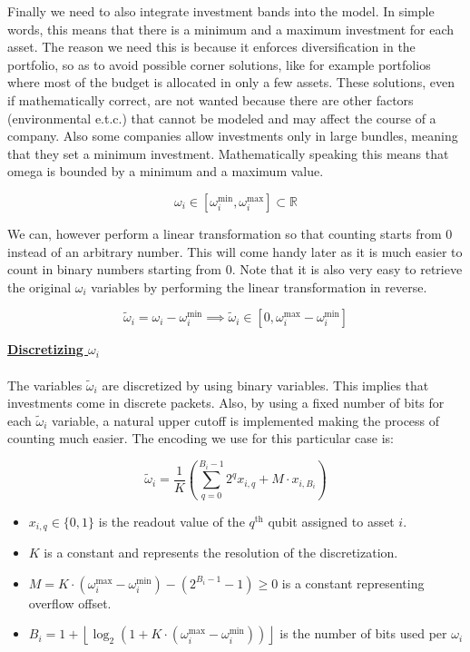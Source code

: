 \documentclass[12pt,a4paper]{report}
\begin{document}
\noindent
Finally we need to also integrate investment bands into the model. In simple words, this means that there is a minimum and a maximum investment for each asset. The reason we need this is because it enforces diversification in the portfolio, so as to avoid possible corner solutions, like for example portfolios where most of the budget is allocated in only a few assets. These solutions, even if mathematically correct, are not wanted because there are other factors (environmental e.t.c.) that cannot be modeled and may affect the course of a company. Also some companies allow investments only in large bundles, meaning that they set a minimum investment. Mathematically speaking this means that omega is bounded by a minimum and a maximum value.

\[ \omega_i \in [\omega_i^{\text{min}}, \omega_i^{\text{max}}] \subset \mathbb{R} \]

\noindent
We can, however perform a linear transformation so that counting starts from 0 instead of an arbitrary number. This will come handy later as it is much easier to count in binary numbers starting from 0. Note that it is also very easy to retrieve the original $\omega_i$ variables by performing the linear transformation in reverse.

\[
\tilde{\omega}_i = \omega_i - \omega_i^{\text{min}} \implies \tilde{\omega}_i \in [0, \omega_i^{\text{max}} - \omega_i^{\text{min}}]
\]

\newpage
\noindent
\textbf{\underline{Discretizing $\omega_i$}}
\\~\\

\noindent
The variables $\tilde{\omega}_i$ are discretized by using binary variables. This implies that investments come in discrete packets. Also, by using a fixed number of bits for each $\tilde{\omega}_i$ variable, a natural upper cutoff is implemented making the process of counting much easier. The encoding we use for this particular case is:

\[
\tilde{\omega}_i = \frac{1}{K} \left( \sum_{q=0}^{B_i-1} 2^q x_{i,q} + M \cdot x_{i,B_i} \right)
\]

\begin{itemize}
    \item $x_{i, q} \in \{0, 1\}$ is the readout value of the $q^{\text{th}}$ qubit assigned to asset $i$.
    \item $K$ is a constant and represents the resolution of the discretization.
    \item $M = K \cdot (\omega_i^{\text{max}} - \omega_i^{\text{min}}) - (2^{B_i -1} - 1) \geq 0$ is a constant representing overflow offset.
    \item $B_i = 1 + \left\lfloor \log_2 \left(1 + K \cdot (\omega_i^{\text{max}} - \omega_i^{\text{min}}) \right) \right\rfloor$ is the number of bits used per $\omega_i$
\end{itemize}
\end{document}
